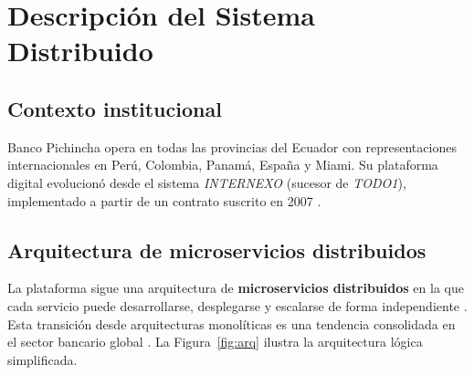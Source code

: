 \documentclass[12pt,a4paper]{article}
\begin{document}
\section{Descripci\'on del Sistema Distribuido}

\subsection{Contexto institucional}

Banco Pichincha opera en todas las provincias del Ecuador con representaciones internacionales en Per\'u, Colombia, Panam\'a, Espa\~na y Miami. Su plataforma digital evolucion\'o desde el sistema \textit{INTERNEXO} (sucesor de \textit{TODO1}), implementado a partir de un contrato suscrito en 2007 \cite{BancoPichincha2025}.

\subsection{Arquitectura de microservicios distribuidos}

La plataforma sigue una arquitectura de \textbf{microservicios distribuidos} en la que cada servicio puede desarrollarse, desplegarse y escalarse de forma independiente \cite{Poniszewska2020}. Esta transici\'on desde arquitecturas monol\'iticas es una tendencia consolidada en el sector bancario global \cite{BucchiaroneMonolith2018}. La Figura~\ref{fig:arq} ilustra la arquitectura l\'ogica simplificada.
\end{document}
